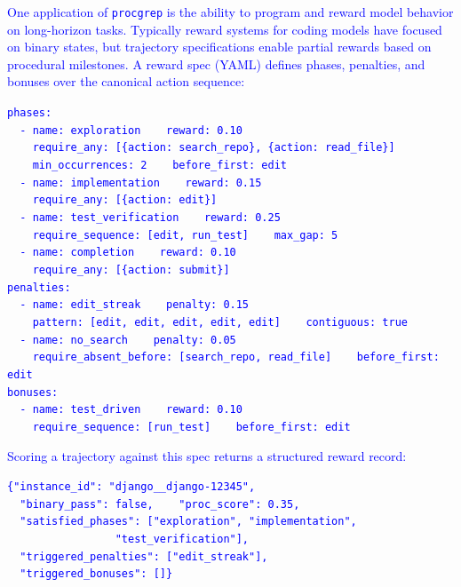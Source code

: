 \documentclass[12pt]{article}
\begin{document}
\textcolor{blue}{One application of \texttt{procgrep} is the ability to program and reward model behavior on long-horizon tasks. Typically reward systems for coding models have focused on binary states, but trajectory specifications enable partial rewards based on procedural milestones. A reward spec (YAML) defines phases, penalties, and bonuses over the canonical action sequence:}

\begin{tcolorbox}[colback=black!3, colframe=black!30, boxrule=0.4pt, left=10pt, right=10pt, top=8pt, bottom=8pt, fontupper=\small]
\textcolor{blue}{
\texttt{phases:}\\
\texttt{~~- name: exploration~~~~reward: 0.10}\\
\texttt{~~~~require\_any: [\{action: search\_repo\}, \{action: read\_file\}]}\\
\texttt{~~~~min\_occurrences: 2~~~~before\_first: edit}\\
\texttt{~~- name: implementation~~~~reward: 0.15}\\
\texttt{~~~~require\_any: [\{action: edit\}]}\\
\texttt{~~- name: test\_verification~~~~reward: 0.25}\\
\texttt{~~~~require\_sequence: [edit, run\_test]~~~~max\_gap: 5}\\
\texttt{~~- name: completion~~~~reward: 0.10}\\
\texttt{~~~~require\_any: [\{action: submit\}]}\\
\texttt{penalties:}\\
\texttt{~~- name: edit\_streak~~~~penalty: 0.15}\\
\texttt{~~~~pattern: [edit, edit, edit, edit, edit]~~~~contiguous: true}\\
\texttt{~~- name: no\_search~~~~penalty: 0.05}\\
\texttt{~~~~require\_absent\_before: [search\_repo, read\_file]~~~~before\_first: edit}\\
\texttt{bonuses:}\\
\texttt{~~- name: test\_driven~~~~reward: 0.10}\\
\texttt{~~~~require\_sequence: [run\_test]~~~~before\_first: edit}
}
\end{tcolorbox}

\textcolor{blue}{Scoring a trajectory against this spec returns a structured reward record:}

\begin{tcolorbox}[colback=black!3, colframe=black!30, boxrule=0.4pt, left=10pt, right=10pt, top=8pt, bottom=8pt, fontupper=\small]
\textcolor{blue}{
\texttt{\{"instance\_id": "django\_\_django-12345",}\\
\texttt{~~"binary\_pass": false,~~~~"proc\_score": 0.35,}\\
\texttt{~~"satisfied\_phases": ["exploration", "implementation",}\\
\texttt{~~~~~~~~~~~~~~~~~"test\_verification"],}\\
\texttt{~~"triggered\_penalties": ["edit\_streak"],}\\
\texttt{~~"triggered\_bonuses": []\}}
}
\end{tcolorbox}
\end{document}
